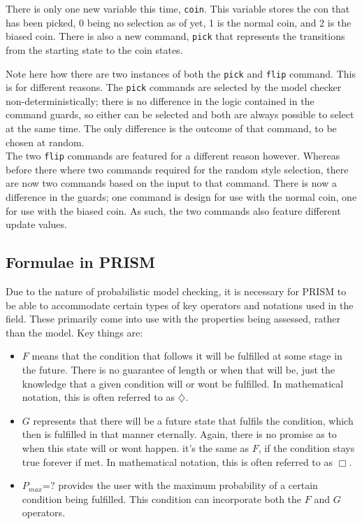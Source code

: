 \documentclass{l4proj}
\begin{document}
There is only one new variable this time, {\tt coin}. This variable stores the con that has been picked, 0 being no selection as of yet, 1 is the normal coin, and 2 is the biased coin. There is also a new command, {\tt pick} that represents the transitions from the starting state to the coin states.

Note here how there are two instances of both the {\tt pick} and {\tt flip} command. This is for different reasons. The {\tt pick} commands are selected by the model checker non-deterministically; there is no difference in the logic contained in the command guards, so either can be selected and both are always possible to select at the same time. The only difference is the outcome of that command, to be chosen at random.\\
The two {\tt flip} commands are featured for a different reason however. Whereas before there where two commands required for the random style selection, there are now two commands based on the input to that command. There is now a difference in the guards; one command is design for use with the normal coin, one for use with the biased coin. As such, the two commands also feature different update values.


\subsection{Formulae in PRISM}

Due to the nature of probabilistic model checking, it is necessary for PRISM to be able to accommodate certain types of key operators and notations used in the field. These primarily come into use with the properties being assessed, rather than the model. Key things are:
\begin{itemize}
\item $F$ means that the condition that follows it will be fulfilled at some stage in the future. There is no guarantee of length or when that will be, just the knowledge that a given condition will or wont be fulfilled. In mathematical notation, this is often referred to as $\diamondsuit$.
\item $G$ represents that there will be a future state that fulfils the condition, which then is fulfilled in that manner eternally. Again, there is no promise as to when this state will or wont happen. it's the same as $F$, if the condition stays true forever if met. In mathematical notation, this is often referred to as $\Box$.
\item $P{_{max}}$=$?$ provides the user with the maximum probability of a certain condition being fulfilled. This condition can incorporate both the $F$ and $G$ operators. 
\end{itemize}
\end{document}
